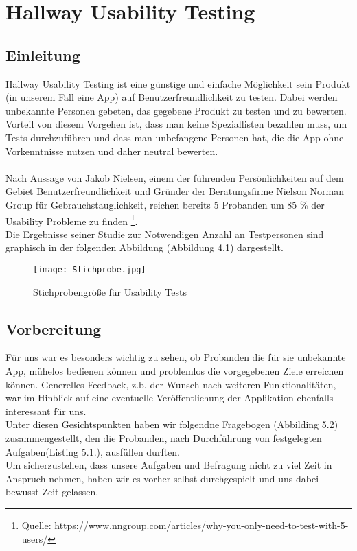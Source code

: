 \documentclass[a4paper]{scrreprt}
\begin{document}
\chapter{Hallway Usability Testing}

\section{Einleitung}
Hallway Usability Testing ist eine günstige und einfache Möglichkeit sein Produkt (in unserem Fall eine App) auf Benutzerfreundlichkeit zu testen. Dabei werden unbekannte Personen gebeten, das gegebene Produkt zu testen und zu bewerten.\\
Vorteil von diesem Vorgehen ist, dass man keine Speziallisten bezahlen muss, um Tests durchzuführen und dass man unbefangene Personen hat, die die App ohne Vorkenntnisse nutzen und daher neutral bewerten. \\ \ \\ 
Nach Aussage von Jakob Nielsen, einem der führenden Persönlichkeiten auf dem Gebiet Benutzerfreundlichkeit und Gründer der Beratungsfirme Nielson Norman Group für Gebrauchstauglichkeit, reichen bereits 5 Probanden um 85 \% der Usability Probleme zu finden
\footnote{
Quelle:  https://www.nngroup.com/articles/why-you-only-need-to-test-with-5-users/}.
\ \\
Die Ergebnisse seiner Studie zur Notwendigen Anzahl an Testpersonen sind graphisch in der folgenden Abbildung (Abbildung 4.1) dargestellt.
\ \\
\begin{figure}[ht]
	\centering
  \texttt{[image: Stichprobe.jpg]}
	\caption{Stichprobengröße für Usability Tests}
	\label{fig2}
\end{figure}
\newpage
\section{Vorbereitung}
Für uns war es besonders wichtig zu sehen, ob Probanden die für sie unbekannte App, mühelos bedienen können und problemlos die vorgegebenen Ziele erreichen können.
Generelles Feedback, z.b. der Wunsch nach weiteren Funktionalitäten, war im Hinblick auf eine eventuelle Veröffentlichung der Applikation ebenfalls interessant für uns. \\
Unter diesen Gesichtspunkten haben wir folgendne Fragebogen (Abbilding 5.2) zusammengestellt, den die Probanden, nach Durchführung von festgelegten Aufgaben(Listing 5.1.), ausfüllen durften.\\
Um sicherzustellen, dass unsere Aufgaben und Befragung nicht zu viel Zeit in Anspruch nehmen, haben wir es vorher selbst durchgespielt und uns dabei bewusst Zeit gelassen.
\end{document}
